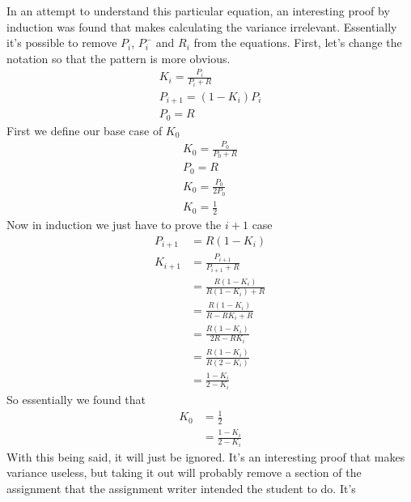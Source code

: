 \documentclass{article}
\newcommand\tab[1][1cm]{\hspace*{#1}}
\begin{document}
\tab In an attempt to understand this particular equation, an interesting proof
by induction was found that makes calculating the variance irrelevant.
Essentially it's possible to remove $P_i$,  $P_i^-$ and $R_i$ from the
equations. First, let's change the notation so that the pattern is more obvious.
\begin{equation*}
    \begin{split}
        K_i = \frac{P_i}{P_i + R} \\
        P_{i+1} = (1-K_i)P_i \\
        P_0 = R
    \end{split}
\end{equation*}
First we define our base case of $K_0$
\begin{equation*}
    \begin{split}
        K_0 = \frac{P_0}{P_0 + R} \\
        P_0 = R \\
        K_0 = \frac{P_0}{2P_0} \\
        K_0 = \frac{1}{2}
    \end{split}
\end{equation*}
Now in induction we just have to prove the $i+1$ case
\begin{equation*}
    \begin{split}
        P_{i+1} & = R(1-K_i) \\
        K_{i+1} & = \frac{P_{i+1}}{P_{i+1} + R} \\
         & = \frac{R(1-K_i)}{R(1-K_i)+R} \\
         & = \frac{R(1-K_i)}{R-RK_i+R} \\
         & = \frac{R(1-K_i)}{2R - RK_i} \\
         & = \frac{R(1-K_i)}{R(2-K_i)} \\
         & = \frac{1-K_i}{2-K_i}
    \end{split}
\end{equation*}
So essentially we found that
\begin{equation*}
    \begin{split}
        K_0 & = \frac{1}{2} \\
        & = \frac{1-K_i}{2-K_i}
    \end{split}
\end{equation*}
\tab With this being said, it will just be ignored. It's an interesting proof that
makes variance useless, but taking it out will probably remove a section of the
assignment that the assignment writer intended the student to do. It's
\end{document}
